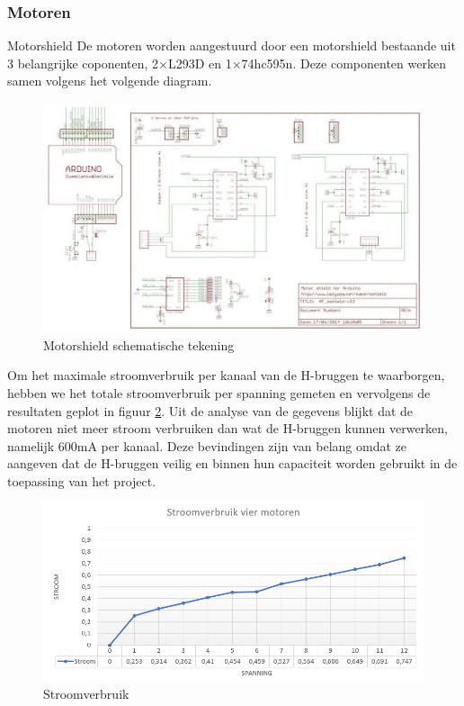 \subsubsection{Motoren}
Motorshield
De motoren worden aangestuurd door een motorshield bestaande uit 3 belangrijke coponenten, 2×L293D en 1×74hc595n. Deze componenten werken samen volgens het volgende diagram.
\begin{figure}[h]
    \centering
    \includegraphics[scale = 0.3]{Media/Figuren/Motorshield_SCHEM.png}
    \caption{Motorshield schematische tekening}
    \label{schematic-Motorshield}   
    \end{figure}

Om het maximale stroomverbruik per kanaal van de H-bruggen te waarborgen, hebben we het totale stroomverbruik per spanning gemeten en vervolgens de resultaten geplot in figuur \ref{Stroomverbruik}. Uit de analyse van de gegevens blijkt dat de motoren niet meer stroom verbruiken dan wat de H-bruggen kunnen verwerken, namelijk 600mA per kanaal. Deze bevindingen zijn van belang omdat ze aangeven dat de H-bruggen veilig en binnen hun capaciteit worden gebruikt in de toepassing van het project.

\begin{figure}[h]
    \centering
    \includegraphics[scale = 0.7]{Media/Figuren/Stroomverbruik.PNG}
    \caption{Stroomverbruik}
    \label{Stroomverbruik}
\end{figure}

